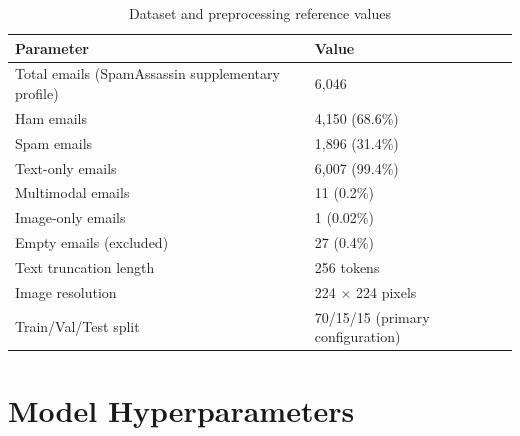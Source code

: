 \documentclass[10pt,twoside]{article}
\begin{document}
\begin{table}[H]
\centering
\caption{Dataset and preprocessing reference values}
\label{tab:appdataset}
\small
\begin{tabular}{ll}\toprule
Parameter & Value \\
\midrule
Total emails (SpamAssassin supplementary profile) & 6,046 \\
Ham emails & 4,150 (68.6\%) \\
Spam emails & 1,896 (31.4\%) \\
Text-only emails & 6,007 (99.4\%) \\
Multimodal emails & 11 (0.2\%) \\
Image-only emails & 1 (0.02\%) \\
Empty emails (excluded) & 27 (0.4\%) \\
Text truncation length & 256 tokens \\
Image resolution & 224 $\times$ 224 pixels \\
Train/Val/Test split & 70/15/15 (primary configuration) \\
\bottomrule
\end{tabular}

\end{table}

\section{Model Hyperparameters}\label{app:B}
\end{document}
